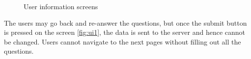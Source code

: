 \begin{figure}[htp]
  \hspace{2em}
  \caption{User information screens}
  \label{fig:ui}
\end{figure}

The users may go back and re-answer the questions, but once the submit button is pressed on the screen \ref{fig:ui1}, the data is sent to the server
and hence cannot be changed. Users cannot navigate to the next pages without filling out all the questions.


